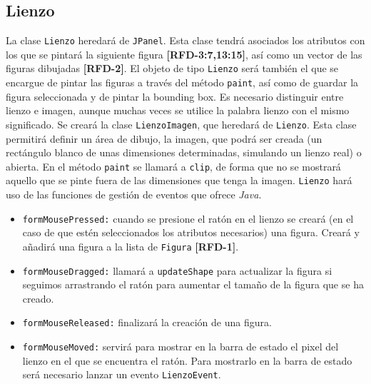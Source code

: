 \subsection{Lienzo}
La clase \texttt{Lienzo} heredará de \texttt{JPanel}. Esta clase tendrá asociados los atributos con los que se pintará la siguiente figura \textbf{[RFD-3:7,13:15]}, así como un vector de las figuras dibujadas \textbf{[RFD-2]}. El objeto de tipo \texttt{Lienzo} será también el que se encargue de pintar las figuras a través del método \texttt{paint}, así como de guardar la figura seleccionada y de pintar la bounding box.  
\vskip0.3cm
Es necesario distinguir entre lienzo e imagen, aunque muchas veces se utilice la palabra lienzo con el mismo significado. Se creará la clase \texttt{LienzoImagen}, que heredará de \texttt{Lienzo}. Esta clase permitirá definir un área de dibujo, la imagen, que podrá ser creada (un rectángulo blanco de unas dimensiones determinadas, simulando un lienzo real) o abierta. En el método \texttt{paint} se llamará a \texttt{clip}, de forma que no se mostrará aquello que se pinte fuera de las dimensiones que tenga la imagen.
\vskip0.3cm
\texttt{Lienzo} hará uso de las funciones de gestión de eventos que ofrece \textit{Java}.
\begin{itemize}
\item{\texttt{formMousePressed:} cuando se presione el ratón en el lienzo se creará (en el caso de que estén seleccionados los atributos necesarios) una figura. Creará y añadirá una figura a la lista de \texttt{Figura} \textbf{[RFD-1]}.}
\item{\texttt{formMouseDragged:} llamará a \texttt{updateShape} para actualizar la figura si seguimos arrastrando el ratón para aumentar el tamaño de la figura que se ha creado.}
\item{\texttt{formMouseReleased:} finalizará la creación de una figura.}
\item{\texttt{formMouseMoved:} servirá para mostrar en la barra de estado el pixel del lienzo en el que se encuentra el ratón. Para mostrarlo en la barra de estado será necesario lanzar un evento \texttt{LienzoEvent}.}
\end{itemize}

